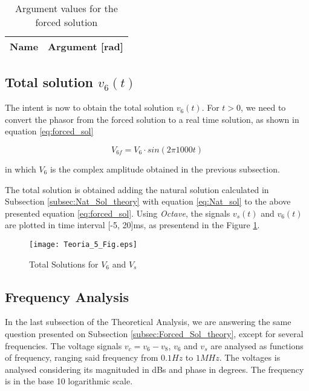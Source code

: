 \begin{table}[!ht]
  \centering
  \begin{tabular}{|l|r|}
    \hline    
    {\bf Name} & {\bf Argument [rad]} \\ \hline
    
  \end{tabular}
  \caption{Argument values for the forced solution }
  \label{tab4_Arg}
\end{table}

\newpage

\subsection{Total solution $v_{6}(t)$}
\label{subsec:total_theory}

The intent is now to obtain the total solution $v_6(t)$. For $t>0$, we need to convert the phasor from the forced solution to a real time solution, as shown in equation \ref{eq:forced_sol}

\begin{equation}
  V_{6f} = V_6 \cdot sin(2 \pi 1000 t)
  \label{eq:forced_sol}
\end{equation}

in which $V_6$ is the complex amplitude obtained in the previous subsection.

The total solution is obtained adding the natural solution calculated in Subsection \ref{subsec:Nat_Sol_theory} with equation \ref{eq:Nat_sol} to the above presented equation \ref{eq:forced_sol}. Using \textit{Octave}, the signals $v_s(t)$ and $v_6(t)$ are plotted in time interval [-5, 20]ms, as presentend in the Figure \ref{plot5}.


\begin{figure}[!ht]
\centering
\texttt{[image: Teoria\_5\_Fig.eps]}
\caption{Total Solutions for $V_6$ and $V_s$}
\label{plot5}
\end{figure}

\subsection{Frequency Analysis}
\label{subsec:freq_theory}

In the last subsection of the Theoretical Analysis, we are answering the same question presented on Subsection \ref{subsec:Forced_Sol_theory}, except for several frequencies. The voltage signals $v_c = v_6 - v_8$, $v_6$ and $v_s$ are analysed as functions of frequency, ranging said frequency from $0.1 Hz$ to $1 MHz$. The voltages is analysed considering its magnituded in dBs and phase in degrees. The frequency is in the base 10 logarithmic scale. 

